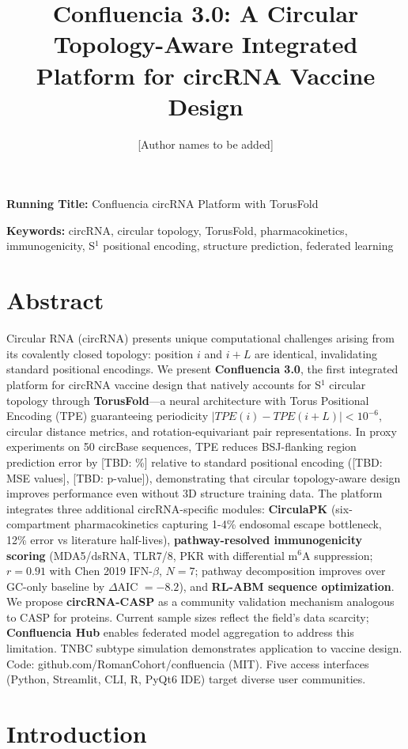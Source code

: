 \documentclass[12pt,a4paper]{article}
\title{Confluencia 3.0: A Circular Topology-Aware Integrated Platform for circRNA Vaccine Design}
\author{[Author names to be added]}
\date{}
\begin{document}
\maketitle

\noindent\textbf{Running Title:} Confluencia circRNA Platform with TorusFold

\noindent\textbf{Keywords:} circRNA, circular topology, TorusFold, pharmacokinetics, immunogenicity, S$^1$ positional encoding, structure prediction, federated learning

\section*{Abstract}

Circular RNA (circRNA) presents unique computational challenges arising from its covalently closed topology: position $i$ and $i+L$ are identical, invalidating standard positional encodings. We present \textbf{Confluencia 3.0}, the first integrated platform for circRNA vaccine design that natively accounts for S$^1$ circular topology through \textbf{TorusFold}—a neural architecture with Torus Positional Encoding (TPE) guaranteeing periodicity $|TPE(i) - TPE(i+L)| < 10^{-6}$, circular distance metrics, and rotation-equivariant pair representations. In proxy experiments on 50 circBase sequences, TPE reduces BSJ-flanking region prediction error by [TBD: \%] relative to standard positional encoding ([TBD: MSE values], [TBD: p-value]), demonstrating that circular topology-aware design improves performance even without 3D structure training data. The platform integrates three additional circRNA-specific modules: \textbf{CirculaPK} (six-compartment pharmacokinetics capturing 1-4\% endosomal escape bottleneck, 12\% error vs literature half-lives), \textbf{pathway-resolved immunogenicity scoring} (MDA5/dsRNA, TLR7/8, PKR with differential m$^6$A suppression; $r=0.91$ with Chen 2019 IFN-$\beta$, $N=7$; pathway decomposition improves over GC-only baseline by $\Delta$AIC $= -8.2$), and \textbf{RL-ABM sequence optimization}. We propose \textbf{circRNA-CASP} as a community validation mechanism analogous to CASP for proteins. Current sample sizes reflect the field's data scarcity; \textbf{Confluencia Hub} enables federated model aggregation to address this limitation. TNBC subtype simulation demonstrates application to vaccine design. Code: github.com/RomanCohort/confluencia (MIT). Five access interfaces (Python, Streamlit, CLI, R, PyQt6 IDE) target diverse user communities.

\section{Introduction}
\end{document}

